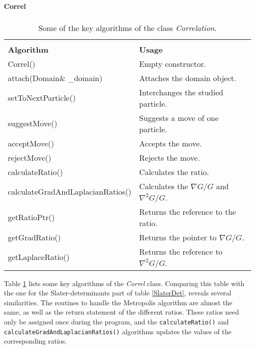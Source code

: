 \begin{table}[hbtp]
\begin{center} {\large \bf Correl} \\ 
$\phantom{a}$ \\
\begin{tabular}{ll}
\hline\\ 
{\bf Algorithm}                          & {\bf Usage} \\
Correl()                                 & Empty constructor. \\
attach(Domain{\footnotesize\&} \_domain) & Attaches the domain object.\\
setToNextParticle()                      & Interchanges the studied particle.\\
suggestMove()                            & Suggests a move of one particle.\\
acceptMove()                             & Accepts the move.\\
rejectMove()                             & Rejects the move.\\
calculateRatio()                         & Calculates the ratio.\\
calculateGradAndLaplacianRatios()        & Calculates the $\nabla G/G$ and $\nabla^2G/G$.\\
getRatioPtr()                            & Returns the reference to the
ratio.\\
getGradRatio()                           & Returns the pointer to $\nabla G/G$.\\
getLaplaceRatio()                        & Returns the reference to
$\nabla^2G/G$.\\  [10pt]
\hline
\end{tabular} 
\end{center}
\caption{Some of the key algorithms of the class \emph{Correlation}.}
\label{correlationAlgorithms}
\end{table}

Table \ref{correlationAlgorithms} lists some key algorithms
of the \emph{Correl} class. Comparing this table with the one for the
Slater-determinants part of table \ref{SlaterDet}, reveals several
similarities. The routines to handle the Metropolis algorithm are
almost the same, as well as the return statement of the different
ratios. These ratios need only be assigned once during the program,
and the \lstinline$calculateRatio()$ and
\lstinline$calculateGradAndLaplacianRatios()$ algorithms updates the
values of the corresponding ratios.




